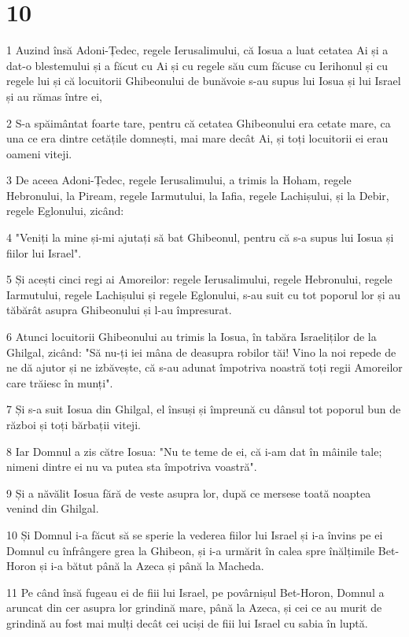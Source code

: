 \chapter{10}

\par 1 Auzind însă Adoni-Țedec, regele Ierusalimului, că Iosua a luat cetatea Ai și a dat-o blestemului și a făcut cu Ai și cu regele său cum făcuse cu Ierihonul și cu regele lui și că locuitorii Ghibeonului de bunăvoie s-au supus lui Iosua și lui Israel și au rămas între ei,
\par 2 S-a spăimântat foarte tare, pentru că cetatea Ghibeonului era cetate mare, ca una ce era dintre cetățile domnești, mai mare decât Ai, și toți locuitorii ei erau oameni viteji.
\par 3 De aceea Adoni-Țedec, regele Ierusalimului, a trimis la Hoham, regele Hebronului, la Piream, regele Iarmutului, la Iafia, regele Lachișului, și la Debir, regele Eglonului, zicând:
\par 4 "Veniți la mine și-mi ajutați să bat Ghibeonul, pentru că s-a supus lui Iosua și fiilor lui Israel".
\par 5 Și acești cinci regi ai Amoreilor: regele Ierusalimului, regele Hebronului, regele Iarmutului, regele Lachișului și regele Eglonului, s-au suit cu tot poporul lor și au tăbărât asupra Ghibeonului și l-au împresurat.
\par 6 Atunci locuitorii Ghibeonului au trimis la Iosua, în tabăra Israeliților de la Ghilgal, zicând: "Să nu-ți iei mâna de deasupra robilor tăi! Vino la noi repede de ne dă ajutor și ne izbăvește, că s-au adunat împotriva noastră toți regii Amoreilor care trăiesc în munți".
\par 7 Și s-a suit Iosua din Ghilgal, el însuși și împreună cu dânsul tot poporul bun de război și toți bărbații viteji.
\par 8 Iar Domnul a zis către Iosua: "Nu te teme de ei, că i-am dat în mâinile tale; nimeni dintre ei nu va putea sta împotriva voastră".
\par 9 Și a năvălit Iosua fără de veste asupra lor, după ce mersese toată noaptea venind din Ghilgal.
\par 10 Și Domnul i-a făcut să se sperie la vederea fiilor lui Israel și i-a învins pe ei Domnul cu înfrângere grea la Ghibeon, și i-a urmărit în calea spre înălțimile Bet-Horon și i-a bătut până la Azeca și până la Macheda.
\par 11 Pe când însă fugeau ei de fiii lui Israel, pe povârnișul Bet-Horon, Domnul a aruncat din cer asupra lor grindină mare, până la Azeca, și cei ce au murit de grindină au fost mai mulți decât cei uciși de fiii lui Israel cu sabia în luptă.
